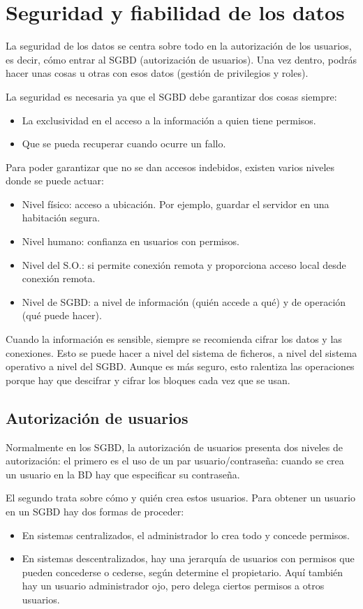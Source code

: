 \chapter{Seguridad y fiabilidad de los datos}

La seguridad de los datos se centra sobre todo en la autorización de los usuarios, es decir, cómo entrar al SGBD (autorización de usuarios). Una vez dentro, podrás hacer unas cosas u otras con esos datos (gestión de privilegios y roles).

La seguridad es necesaria ya que el SGBD debe garantizar dos cosas siempre:
\begin{itemize}
\item La exclusividad en el acceso a la información a quien tiene permisos.
\item Que se pueda recuperar cuando ocurre un fallo.
\end{itemize}

Para poder garantizar que no se dan accesos indebidos, existen varios niveles donde se puede actuar:
\begin{itemize}
\item Nivel físico: acceso a ubicación. Por ejemplo, guardar el servidor en una habitación segura.
\item Nivel humano: confianza en usuarios con permisos.
\item Nivel del S.O.: si permite conexión remota y proporciona acceso local desde conexión remota.
\item Nivel de SGBD: a nivel de información (quién accede a qué) y de operación  (qué puede hacer).
\end{itemize}

Cuando la información es sensible, siempre se recomienda cifrar los datos y las conexiones. Esto se puede hacer a nivel del sistema de ficheros, a nivel del sistema operativo a nivel del SGBD. Aunque es más seguro, esto ralentiza las operaciones porque hay que descifrar y cifrar los bloques cada vez que se usan. 

\section{Autorización de usuarios}

Normalmente en los SGBD, la autorización de usuarios presenta dos niveles de autorización: el primero es el uso de un par usuario/contraseña: cuando se crea un usuario en la BD hay que especificar su contraseña. 

El segundo trata sobre cómo y quién crea estos usuarios. Para obtener un usuario en un SGBD hay dos formas de proceder:
\begin{itemize}
\item En sistemas centralizados, el administrador lo crea todo y concede permisos.
\item En sistemas descentralizados, hay una jerarquía de usuarios con permisos que pueden concederse o cederse, según determine el propietario. Aquí también hay un usuario administrador ojo, pero delega ciertos permisos a otros usuarios.  
\end{itemize}

